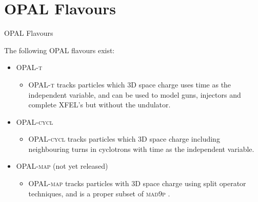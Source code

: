 \documentclass[xcolor=pdftex,table,10pt,yellow,mathserif]{beamer}
\newcommand{\opal}{\textsc{OPAL }}
\newcommand{\opalt}{\textsc{OPAL-t }}
\newcommand{\opalcycl}{\textsc{OPAL-cycl }}
\newcommand{\opalmap}{\textsc{OPAL-map }}
\newcommand{\madninep}{\textsc{mad9p }}
\newcommand{\vc}[1]{\mbox{\boldmath $#1$}}
\begin{document}
\section{\opal Flavours}
\begin{frame}{\opal Flavours}
\begin{block}{}  
The following OPAL flavours  exist:
\begin{itemize}
\item \opalt 
\begin{itemize}
\item \opalt   tracks particles which 3D space charge uses time as the independent variable, and can be used to model guns, injectors and complete XFEL's but without the undulator.
\end{itemize}
\item \opalcycl 
\begin{itemize}
\item \opalcycl tracks particles which 3D space charge including neighbouring turns in cyclotrons
with time as the independent variable. 
\end{itemize}
\item \opalmap (not yet released)
\begin{itemize}
\item \opalmap tracks particles with 3D space charge using split operator techniques, and is a proper subset of \madninep. %
\end{itemize}
\end{itemize}
\end{block}

\end{frame}
\end{document}
